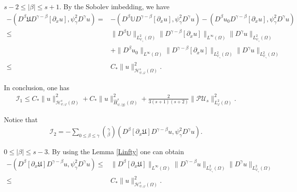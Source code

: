 \documentclass{amsart}
\numberwithin{equation}{section}
\newcommand\y{{{\langle y \rangle}}}
\begin{document}
 $s-2\leq|\beta|\leq s+1$. By the Sobolev imbedding, we have
\begin{align*}
-(D^{\beta}\mathfrak{U}D^{\gamma-\beta}[\partial_{x}u],\psi_{\gamma}^{2} D^{\gamma}u)
=&-(D^{\beta}\mathbb{U}D^{\gamma-\beta}[\partial_{x}u],\psi_{\gamma}^{2} D^{\gamma}u)
  -(D^{\beta}u_{0}D^{\gamma-\beta}[\partial_{x}u],\psi_{\gamma}^{2} D^{\gamma}u)\\
\leq& \|D^{\beta}\mathbb{U}\|_{L_{\psi_{\gamma}}^{2}(\Omega)}
      \|D^{\gamma-\beta}[\partial_{x}u]\|_{L^{\infty}(\Omega)}
      \|D^{\gamma}u\|_{L_{\psi_{\gamma}}^{2}(\Omega)}\\
    &+\|D^{\beta}u_{0}\|_{L^{\infty}(\Omega)}
      \|D^{\gamma-\beta}[\partial_{x}u]\|_{L_{\psi_{\gamma}}^{2}(\Omega)}
      \|D^{\gamma}u\|_{L_{\psi_{\gamma}}^{2}(\Omega)}\\
\leq& C_{*}\|u\|_{\mathcal{H}_{\psi,\varphi}^{s}(\Omega)}^{2}.
\end{align*}

In conclusion, one has
\begin{align*}
\mathcal{I}_{1}
\leq C_{*}\|u\|_{\mathcal{H}_{\psi,\varphi}^{s}(\Omega)}^{2}
    +C_{*}\|u\|_{\hat{H}_{\psi,\y}^{s}(\Omega)}^{2}
    +\frac{2}{3(s+1)(s+2)}\|\mathcal{P}\mathcal{U}_{s}\|_{L_{\varphi}^{2}(\Omega)}^{2}.
\end{align*}

Notice that
\begin{align*}
\mathcal{I}_{2}
=-\sum_{0\leq\beta\leq\gamma}\binom{\gamma}{\beta}(D^{\beta}[\partial_{x}\mathfrak{U}]D^{\gamma-\beta}u,\psi_{\gamma}^{2} D^{\gamma}u).
\end{align*}

 $0\leq|\beta|\leq s-3$. By using the Lemma \ref{Linfty} one can obtain
\begin{align*}
-(D^{\beta}[\partial_{x}\mathfrak{U}]D^{\gamma-\beta}u,\psi_{\gamma}^{2}D^{\gamma}u)
\leq& \|D^{\beta}[\partial_{x}\mathfrak{U}]\|_{L^{\infty}(\Omega)}
      \|D^{\gamma-\beta}u\|_{L_{\psi_{\gamma}}^{2}(\Omega)}
      \|D^{\gamma}u\|_{L_{\psi_{\gamma}}^{2}(\Omega)}\\
\leq& C_{*}\|u\|_{\mathcal{H}_{\psi,\varphi}^{s}(\Omega)}^{2}.
\end{align*}
\end{document}
